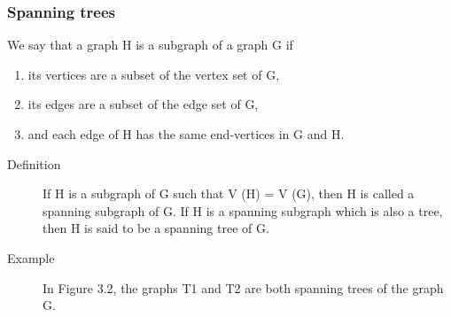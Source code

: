 \documentclass{beamer}
\begin{document}
\begin{frame}
\frametitle{Spanning trees}
We say that a graph H is a subgraph of a graph G if

\begin{enumerate}
\item its vertices are
a subset of the vertex set of G, 
\item its edges are a subset of the edge set
of G, 
\item and each edge of H has the same end-vertices in G and H.
\end{enumerate} 
\end{frame}
\begin{frame}
\begin{description}
\item[Definition]  If H is a subgraph of G such that V (H) = V (G), then H
is called a spanning subgraph of G. If H is a spanning subgraph
which is also a tree, then H is said to be a spanning tree of G.

\item[Example] In Figure 3.2, the graphs T1 and T2 are both spanning
trees of the graph G.
\end{description}
\end{frame}
\end{document}
